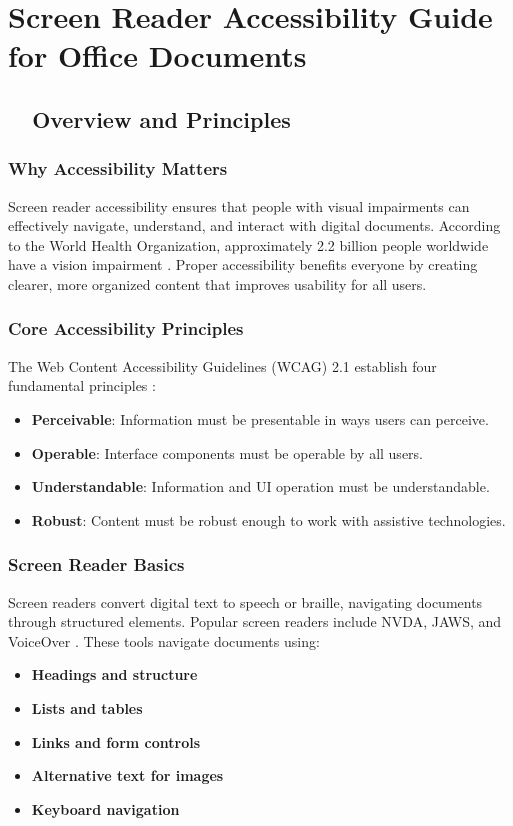 \chapter{Screen Reader Accessibility Guide for Office Documents}\label{ch15:office-accessibility}

\section{~~Overview and Principles}\label{ch15:sec:overview}

\subsection{Why Accessibility Matters}\label{ch15:ssec:why-matters}
Screen reader accessibility ensures that people with visual impairments can effectively navigate, understand, and interact with digital documents. According to the World Health Organization, approximately 2.2 billion people worldwide have a vision impairment \supercite{WHO2021}. Proper accessibility benefits everyone by creating clearer, more organized content that improves usability for all users.

\subsection{Core Accessibility Principles}\label{ch15:ssec:core-principles}
The Web Content Accessibility Guidelines (WCAG) 2.1 establish four fundamental principles \supercite{WCAG2018}:
\begin{itemize}
	\item \textbf{Perceivable}: Information must be presentable in ways users can perceive.
	\item \textbf{Operable}: Interface components must be operable by all users.
	\item \textbf{Understandable}: Information and UI operation must be understandable.
	\item \textbf{Robust}: Content must be robust enough to work with assistive technologies.
\end{itemize}

\subsection{Screen Reader Basics}\label{ch15:ssec:sr-basics}
Screen readers convert digital text to speech or braille, navigating documents through structured elements. Popular screen readers include NVDA, JAWS, and VoiceOver \supercite{NVDA2023, JAWS2023, VoiceOver2023}. These tools navigate documents using:
\begin{itemize}
	\item \textbf{Headings and structure}
	\item \textbf{Lists and tables}
	\item \textbf{Links and form controls}
	\item \textbf{Alternative text for images}
	\item \textbf{Keyboard navigation}
\end{itemize}

